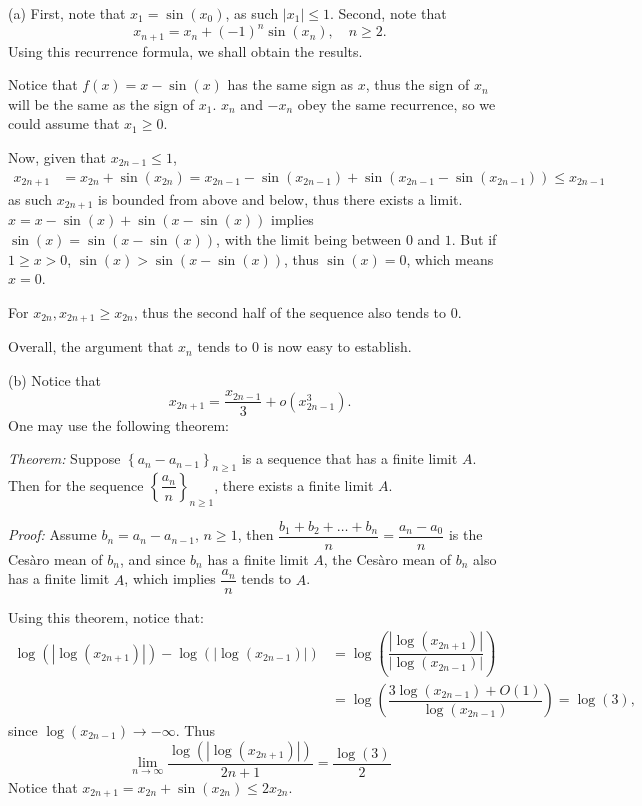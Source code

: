 \begin{solution}
    (a) First, note that \( x_1 = \sin\left(x_0\right) \), as such \( \left| x_1 \right| \leq 1 \). Second, note that
    \[
        x_{n+1} = x_n + \left(-1\right)^n \sin\left(x_n\right), \quad n \geq 2.
    \]
    Using this recurrence formula, we shall obtain the results.

    Notice that \( f\left(x\right) = x - \sin\left(x\right) \) has the same sign as \( x \), thus the sign of \( x_n \) will be the same as the sign of \( x_1 \). \( x_n \) and \( -x_n \) obey the same recurrence, so we could assume that \( x_1 \geq 0 \).

    Now, given that \( x_{2n-1} \leq 1 \),
    \begin{align*}
        x_{2n+1} &= x_{2n} + \sin(x_{2n}) = x_{2n-1} - \sin(x_{2n-1}) + \sin\left(x_{2n-1} - \sin(x_{2n-1})\right) \leq x_{2n-1}
    \end{align*}
    as such \( x_{2n+1} \) is bounded from above and below, thus there exists a limit. \( x = x - \sin\left(x\right) + \sin\left(x - \sin\left(x\right)\right) \) implies \( \sin\left(x\right) = \sin\left(x - \sin\left(x\right)\right) \), with the limit being between \( 0 \) and \( 1 \). But if \( 1 \geq x > 0 \), \( \sin\left(x\right) > \sin\left(x - \sin\left(x\right)\right) \), thus \( \sin\left(x\right) = 0 \), which means \( x = 0 \).

    For \( x_{2n}, x_{2n+1} \geq x_{2n} \), thus the second half of the sequence also tends to \( 0 \).

    Overall, the argument that \( x_n \) tends to \( 0 \) is now easy to establish.

    (b) Notice that
    \[
        x_{2n+1} = \dfrac{x_{2n-1}}{3} + o\left(x_{2n-1}^3\right).
    \]
    One may use the following theorem:

    \textit{Theorem:} Suppose \( \left\{a_n - a_{n-1}\right\}_{n \geq 1} \) is a sequence that has a finite limit \( A \). Then for the sequence \( \left\{ \dfrac{a_n}{n} \right\}_{n \geq 1} \), there exists a finite limit \( A \).

    \textit{Proof:} Assume \( b_n = a_n - a_{n-1}, \, n \geq 1 \), then \( \dfrac{b_1 + b_2 + \dots + b_n}{n} = \dfrac{a_n - a_0}{n} \) is the Cesàro mean of \( b_n \), and since \( b_n \) has a finite limit \( A \), the Cesàro mean of \( b_n \) also has a finite limit \( A \), which implies \( \dfrac{a_n}{n} \) tends to \( A \).

    Using this theorem, notice that:
    \begin{align*}
        \log\left( \left| \log(x_{2n+1}) \right| \right) - \log\left( \left| \log(x_{2n-1}) \right| \right) &= \log\left( \dfrac{ \left| \log(x_{2n+1}) \right| }{ \left| \log(x_{2n-1}) \right| } \right) \\
        &= \log\left( \dfrac{3 \log(x_{2n-1}) + O(1)}{\log(x_{2n-1})} \right) = \log(3),
    \end{align*}
    since \( \log\left(x_{2n-1}\right) \to -\infty \). Thus
    \[
        \lim_{n \to \infty} \dfrac{\log\left( \left| \log\left(x_{2n+1}\right) \right| \right)}{2n+1} = \dfrac{\log\left(3\right)}{2}
    \]
    Notice that \( x_{2n+1} = x_{2n} + \sin\left(x_{2n}\right) \leq 2x_{2n} \).


\end{solution}
